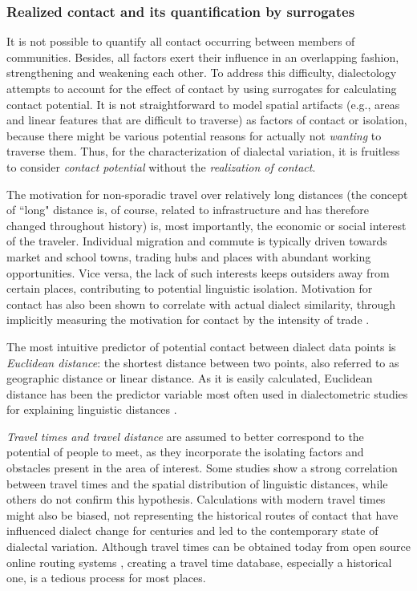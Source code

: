 \documentclass[output=paper]{langscibook}
\begin{document}
\subsubsection{Realized contact and its quantification by surrogates} 
It is not possible to quantify all contact occurring between members of communities. Besides, all factors exert their influence in an overlapping fashion, strengthening and weakening each other. To address this difficulty, dialectology attempts to account for the effect of contact by using surrogates for calculating contact potential.
It is not straightforward to model spatial artifacts (e.g., areas and linear features that are difficult to traverse) as factors of contact or isolation, because there might be various potential reasons for actually not \textit{wanting} to traverse them. Thus, for the characterization of dialectal variation, it is fruitless to consider \textit{contact potential} without the \textit{realization of contact}. 

The motivation for non-sporadic travel over relatively long distances (the concept of ``long" distance is, of course, related to infrastructure and has therefore changed throughout history) is, most importantly, the economic or social interest of the traveler. Individual migration and commute is typically driven towards market and school towns, trading hubs and places with abundant working opportunities. Vice versa, the lack of such interests keeps outsiders away from certain places, contributing to potential linguistic isolation. Motivation for contact has also been shown to correlate with actual dialect similarity, through implicitly measuring the motivation for contact by the intensity of trade \parencite[][]{Falck2012, Falck2016, Lameli2015}.

The most intuitive predictor of potential contact between dialect data points is
\textit{Euclidean distance}: the shortest distance between two points, also referred to as geographic distance or linear distance. As it is easily calculated, Euclidean distance has been the predictor variable most often used in dialectometric studies for explaining linguistic distances \parencite[e.g.,][]{Seguy1971, Heeringa2001, Nerbonne2010a, Hadj2017}. 

\textit{Travel times and travel distance} are assumed to better correspond to the potential of people to meet, as they incorporate the isolating factors and obstacles present in the area of interest. Some studies \parencite[][]{Gooskens2004, Jeszenszky2017} show a strong correlation between travel times and the spatial distribution of linguistic distances, while others \parencite[][]{VanGemert2002, Stanford2012, Szmrecsanyi2012} do not confirm this hypothesis. Calculations with modern travel times might also be biased, not representing the historical routes of contact that have influenced dialect change for centuries and led to the contemporary state of dialectal variation. Although  travel times can be obtained today from open source online routing systems \parencite[e.g., \textit{osrm} --][]{Giraud2019}, creating a travel time database, especially a historical one, is a tedious process for most places.
\end{document}
